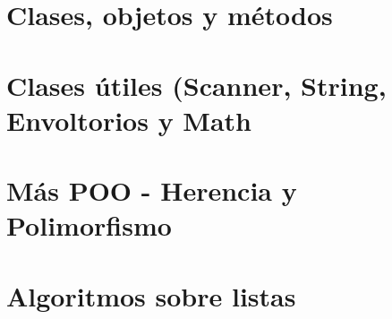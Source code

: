 \documentclass[12pt, twoside, openright]{report} %
\begin{document}
\part{Clases, objetos y métodos}



\part{Clases útiles (Scanner, String, Envoltorios y Math}



\part{Más POO - Herencia y Polimorfismo}



\part{Algoritmos sobre listas}





\end{document}
